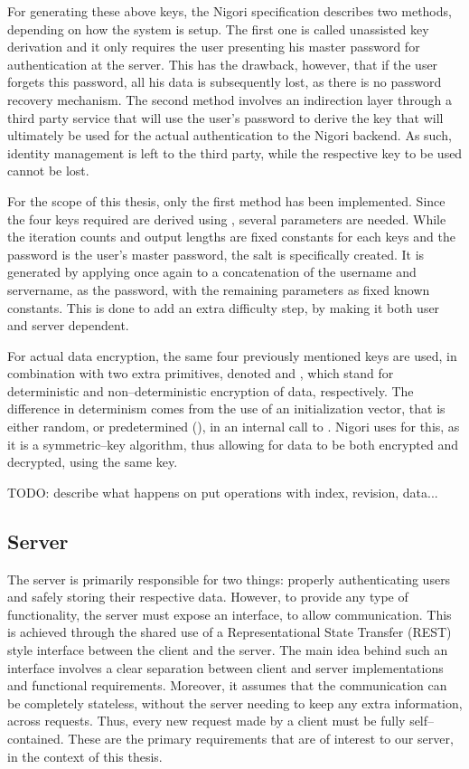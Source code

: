 For generating these above keys, the Nigori specification describes two methods, depending on how the system is setup.
The first one is called unassisted key derivation and it only requires the user presenting his master password for authentication at the server.
This has the drawback, however, that if the user forgets this password, all his data is subsequently lost, as there is no password recovery mechanism.
The second method involves an indirection layer through a third party service that will use the user's password to derive the key that will ultimately be used for the actual authentication to the Nigori backend.
As such, identity management is left to the third party, while the respective key to be used cannot be lost.

For the scope of this thesis, only the first method has been implemented.
Since the four keys required are derived using , several parameters are needed.
While the iteration counts and output lengths are fixed constants for each keys and the password is the user's master password, the salt is specifically created.
It is generated by applying  once again to a concatenation of the username and servername, as the password, with the remaining parameters as fixed known constants.
This is done to add an extra difficulty step, by making it both user and server dependent.

For actual data encryption, the same four previously mentioned keys are used, in combination with two extra primitives, denoted  and , which stand for deterministic and non--deterministic encryption of data, respectively.
The difference in determinism comes from the use of an initialization vector, that is either random, or predetermined (), in an internal call to  \cite{AES}.
Nigori uses  for this, as it is a symmetric--key algorithm, thus allowing for data to be both encrypted and decrypted, using the same key.

TODO: describe what happens on put operations with index, revision, data...

\subsection{Server}
The server is primarily responsible for two things: properly authenticating users and safely storing their respective data.
However, to provide any type of functionality, the server must expose an interface, to allow communication.
This is achieved through the shared use of a Representational State Transfer (REST) \cite{REST} style interface between the client and the server.
The main idea behind such an interface involves a clear separation between client and server implementations and functional requirements.
Moreover, it assumes that the communication can be completely stateless, without the server needing to keep any extra information, across requests.
Thus, every new request made by a client must be fully self--contained.
These are the primary requirements that are of interest to our server, in the context of this thesis.

